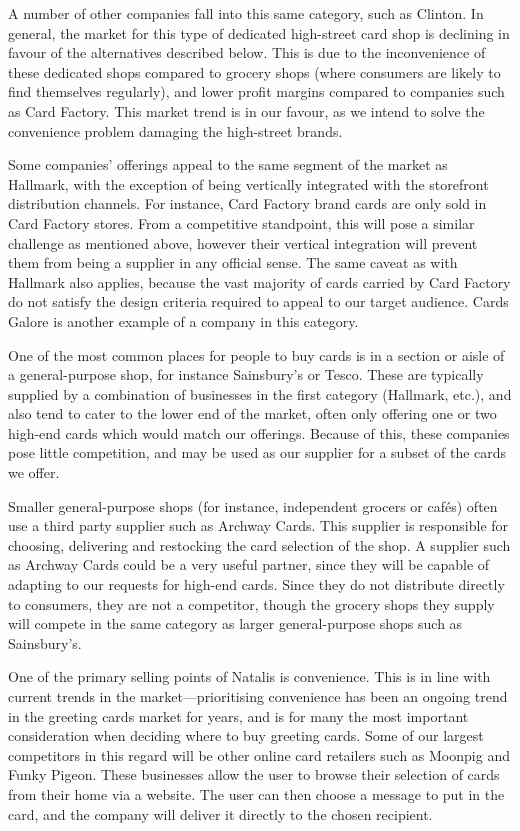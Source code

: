 \documentclass[10pt,a4paper]{article}
\begin{document}
A number of other companies fall into this same category, such as Clinton. In general, the market for this type of dedicated high-street card shop is declining in favour of the alternatives described below. This is due to the inconvenience of these dedicated shops compared to grocery shops (where consumers are likely to find themselves regularly), and lower profit margins compared to companies such as Card Factory. This market trend is in our favour, as we intend to solve the convenience problem damaging the high-street brands.

Some companies' offerings appeal to the same segment of the market as Hallmark, with the exception of being vertically integrated with the storefront distribution channels. For instance, Card Factory brand cards are only sold in Card Factory stores. From a competitive standpoint, this will pose a similar challenge as mentioned above, however their vertical integration will prevent them from being a supplier in any official sense. The same caveat as with Hallmark also applies, because the vast majority of cards carried by Card Factory do not satisfy the design criteria required to appeal to our target audience. Cards Galore is another example of a company in this category.

One of the most common places for people to buy cards is in a section or aisle of a general-purpose shop, for instance Sainsbury's or Tesco. These are typically supplied by a combination of businesses in the first category (Hallmark, etc.), and also tend to cater to the lower end of the market, often only offering one or two high-end cards which would match our offerings. Because of this, these companies pose little competition, and may be used as our supplier for a subset of the cards we offer.

Smaller general-purpose shops (for instance, independent grocers or caf\'es) often use a third party supplier such as Archway Cards. This supplier is responsible for choosing, delivering and restocking the card selection of the shop. A supplier such as Archway Cards could be a very useful partner, since they will be capable of adapting to our requests for high-end cards. Since they do not distribute directly to consumers, they are not a competitor, though the grocery shops they supply will compete in the same category as larger general-purpose shops such as Sainsbury's.


One of the primary selling points of Natalis is convenience. This is in line with current trends in the market---prioritising convenience has been an ongoing trend in the greeting cards market for years, and is for many the most important consideration when deciding where to buy greeting cards. Some of our largest competitors in this regard will be other online card retailers such as Moonpig and Funky Pigeon. These businesses allow the user to browse their selection of cards from their home via a website. The user can then choose a message to put in the card, and the company will deliver it directly to the chosen recipient.
\end{document}
